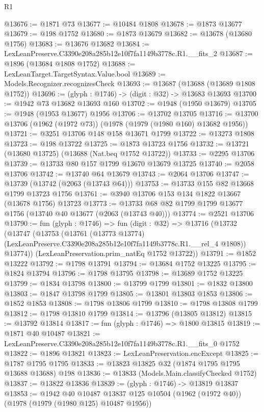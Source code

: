 \begin{lexlean}{R1}
\begin{coremodule}
@13676 := @1871 @73
@13677 := @10484 @1808
@13678 := @1873 @13677
@13679 := @198 @1752
@13680 := @1873 @13679
@13682 := @13678 (@13680 @1756)
@13683 := @13676 @13682
@13684 := LexLeanPreserve.C3390e208a285b12e10f7fa1149b3778c.R1.__fits_2
@13687 := @1896 (@13684 @1808 @1752)
@13688 := LexLeanTarget.TargetSyntax.Value.bool
@13689 := Models.Recognizer.recognizesCheck
@13693 := @13687 (@13688 (@13689 @1808 @1752))
@13696 := (glyph : @1746) -> (digit : @32) -> @13683 @13693
@13700 := @1942 @73 @13682 @13693 @160
@13702 := @1948 (@1950 @13679)
@13705 := @1948 (@1953 @13677) @1956
@13706 := @13702 @13705
@13716 := @13700 @13706 (@1962 (@1972 @73)) (@1978 (@1979 (@1980 @160) @13682 @1956))
@13721 := @3251 @13706 @148 @158 @13671 @1799
@13722 := @13273 @1808
@13723 := @198 @13722
@13725 := @1873 @13723 @1756
@13732 := @13721 (@13680 @13725) (@13688 (Nat.beq @1752 @13722))
@13733 := @2295 @13706
@13739 := @13733 @80 @157 @1799 @13670 @13679 @13725
@13740 := @2058 @13706
@13742 := @13740 @64 @13679
@13743 := @2064 @13706
@13747 := @13739 (@13742 (@2063 (@13743 @64)))
@13753 := @13733 @155 @82 @13668 @1799 @13723 @1756
@13761 := @3940 @13706 @153 @134 @1822 @13667 (@13678 @1756) @13723
@13773 := @13733 @68 @82 @1799 @1799 @13677 @1756 (@13740 @40 @13677 (@2063 (@13743 @40)))
@13774 := @2521 @13706
@13790 := fun (glyph : @1746) =>
  fun (digit : @32) =>
  @13716
    (@13732
      (@13747
        (@13753
          (@13761
            (@13773 @13774)
            (LexLeanPreserve.C3390e208a285b12e10f7fa1149b3778c.R1.__rel_4 @1808))
          @13774))
      (LexLeanPreservation.prim_natEq @1752 @13722))
@13791 := @1852 @13222
@13792 := @1798 @13791
@13794 := @13684 @1752 @13225
@13795 := @1824 @13794
@13796 := @1798 @13795
@13798 := @13689 @1752 @13225
@13799 := @1834 @13798
@13800 := @13799 @1799
@13801 := @1832 @13800
@13803 := @1847 @13798 @1799
@13805 := @13801 @13803 @1853
@13806 := @1852 @1853
@13808 := @1798 @13806 @1799
@13810 := @1798 @13808 @1799
@13812 := @1798 @13810 @1799
@13814 := @13796 (@13805 @13812)
@13815 := @13792 @13814
@13817 := fun (glyph : @1746) => @1800 @13815
@13819 := @1871 @40 @10487
@13821 := LexLeanPreserve.C3390e208a285b12e10f7fa1149b3778c.R1.__fits_0 @1752
@13822 := @1896 @13821
@13823 := LexLeanPreservation.encExcept
@13825 := @1787 @1795 @1795
@13833 := @13823 @13825 @32 (@1874 @1795 @1795 @13688 @13688) @198
@13836 := @13833 (Models.Main.classifyChecked @1752)
@13837 := @13822 @13836
@13839 := (glyph : @1746) -> @13819 @13837
@13853 := @1942
    @40
    @10487
    @13837
    @125
    @10504
    (@1962 (@1972 @40))
    (@1978 (@1979 (@1980 @125) @10487 @1956))

\end{coremodule}
\end{lexlean}
